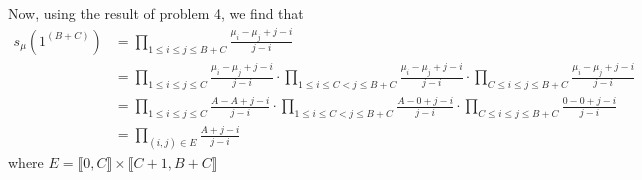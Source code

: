\documentclass[12pt]{article}
\begin{document}
	Now, using the result of problem 4, we find that 
	\begin{align*}s_\mu(1^{(B+C)})&=\prod_{1\leq i\leq j\leq B+C}\frac{\mu_i-\mu_j+j-i}{j-i}\\
	&=\prod_{1\leq i\leq j \leq C}\frac{\mu_i-\mu_j+j-i}{j-i}\cdot\prod_{1\leq i \leq C<j\leq B+C} \frac{\mu_i-\mu_j+j-i}{j-i} \cdot \prod_{C\leq i\leq j \leq B+C}\frac{\mu_i-\mu_j+j-i}{j-i}\\
	&=\prod_{1\leq i\leq j \leq C}\frac{A-A+j-i}{j-i}\cdot\prod_{1\leq i \leq C<j\leq B+C} \frac{A-0+j-i}{j-i} \cdot \prod_{C\leq i\leq j \leq B+C}\frac{0-0+j-i}{j-i}\\
	&=\prod_{(i,j)\in E} \frac{A+j-i}{j-i}
	\end{align*} where $E=\llbracket{0,C}\rrbracket \times \llbracket C+1, B+C\rrbracket$
	
		
\end{document}
